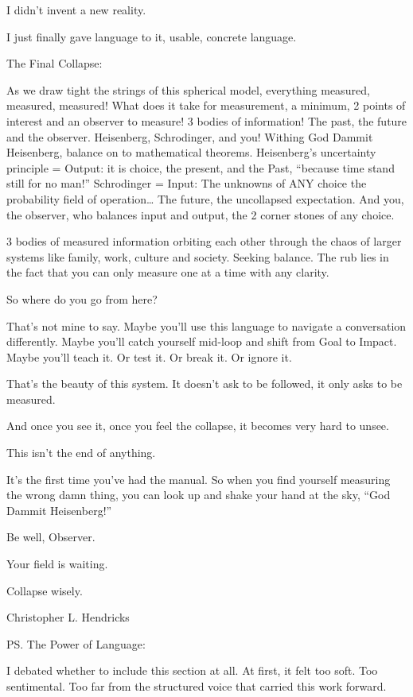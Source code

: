 \documentclass[11pt]{article}
\begin{document}
I didn’t invent a new reality.

I just finally gave language to it, usable, concrete language.

The Final Collapse:

As we draw tight the strings of this spherical model, everything measured, measured, measured! What does it take for measurement, a minimum, 2 points of interest and an observer to measure! 3 bodies of information! The past, the future and the observer. Heisenberg, Schrodinger, and you!
Withing God Dammit Heisenberg, balance on to mathematical theorems. 
Heisenberg’s uncertainty principle = Output: it is choice, the present, and the Past, “because time stand still for no man!”
Schrodinger = Input: The unknowns of ANY choice the probability field of operation… The future, the uncollapsed expectation. 
And you, the observer, who balances input and output, the 2 corner stones of any choice.

3 bodies of measured information orbiting each other through the chaos of larger systems like family, work, culture and society. Seeking balance. The rub lies in the fact that you can only measure one at a time with any clarity. 

So where do you go from here?

That’s not mine to say. Maybe you’ll use this language to navigate a conversation differently.
Maybe you’ll catch yourself mid-loop and shift from Goal to Impact. Maybe you’ll teach it. Or test it. Or break it. Or ignore it.

That’s the beauty of this system. It doesn’t ask to be followed, it only asks to be measured.

And once you see it, once you feel the collapse, it becomes very hard to unsee.

This isn’t the end of anything.

It’s the first time you’ve had the manual.
So when you find yourself measuring the wrong damn thing, you can look up and shake your hand at the sky, “God Dammit Heisenberg!”

Be well, Observer.

Your field is waiting.

Collapse wisely.

Christopher L. Hendricks

PS. The Power of Language:

I debated whether to include this section at all. At first, it felt too soft. Too sentimental. Too far from the structured voice that carried this work forward.
\end{document}
